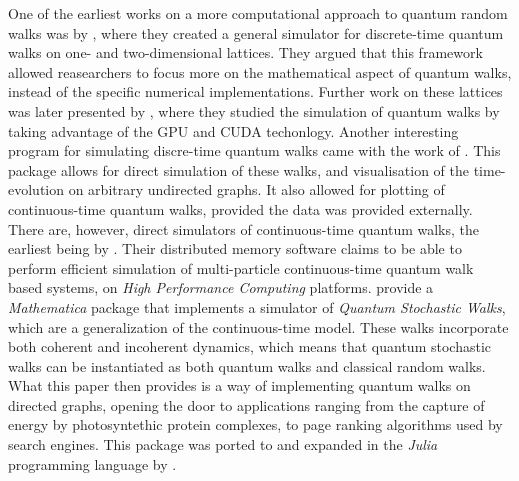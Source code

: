 \documentclass[../../dissertation.tex]{subfiles}
\begin{document}
One of the earliest works on a more computational approach to quantum random
walks was by \cite{marquezino2008}, where they created a general simulator for
discrete-time quantum walks on one- and two-dimensional lattices. They argued
that this framework allowed reasearchers to focus more on the mathematical
aspect of quantum walks, instead of the specific numerical implementations.
Further work on these lattices was later presented by \cite{sawerwain2010},
where they studied the simulation of quantum walks by taking advantage of the
GPU and CUDA techonlogy. Another interesting program for simulating discre-time
quantum walks came with the work of \cite{berry2011}. This package allows for
direct simulation of these walks, and visualisation of the time-evolution on
arbitrary undirected graphs. It also allowed for plotting of continuous-time
quantum walks, provided the data was provided externally. 
There are, however, direct simulators of continuous-time quantum walks, the
earliest being by \cite{izaac2015}. Their distributed memory software claims to
be able to perform efficient simulation of multi-particle continuous-time
quantum walk based systems, on \textit{High Performance Computing} platforms.
\cite{falloon2017a} provide a \textit{Mathematica} package that implements a
simulator of \textit{Quantum Stochastic Walks}, which are a generalization of
the continuous-time model. These walks incorporate both coherent and incoherent
dynamics, which means that quantum stochastic walks can be instantiated as both
quantum walks and classical random walks. What this paper then provides is a
way of implementing quantum walks on directed graphs, opening the door to
applications ranging from the capture of energy by photosyntethic protein
complexes, to page ranking algorithms used by search engines. This package was
ported to and expanded in the \textit{Julia} programming language by
\cite{glos2018}.\par
\end{document}
